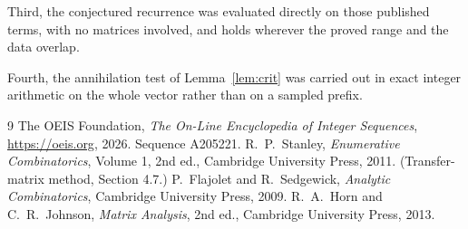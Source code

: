 \documentclass[11pt,a4paper]{article}
\theoremstyle{plain}
\theoremstyle{definition}
\begin{document}
Third, the conjectured recurrence was evaluated directly on those published terms, with no
matrices involved, and holds wherever the proved range and the data overlap.

Fourth, the annihilation test of Lemma~\ref{lem:crit} was carried out in exact integer
arithmetic on the whole vector rather than on a sampled prefix.

\begin{thebibliography}{9}
 The OEIS Foundation, \emph{The On-Line Encyclopedia of Integer
Sequences}, \url{https://oeis.org}, 2026. Sequence A205221.
 R.~P.~Stanley, \emph{Enumerative Combinatorics}, Volume 1, 2nd ed.,
Cambridge University Press, 2011. (Transfer-matrix method, Section 4.7.)
 P.~Flajolet and R.~Sedgewick, \emph{Analytic Combinatorics}, Cambridge
University Press, 2009.
 R.~A.~Horn and C.~R.~Johnson, \emph{Matrix Analysis}, 2nd ed., Cambridge
University Press, 2013.
\end{thebibliography}
\end{document}
